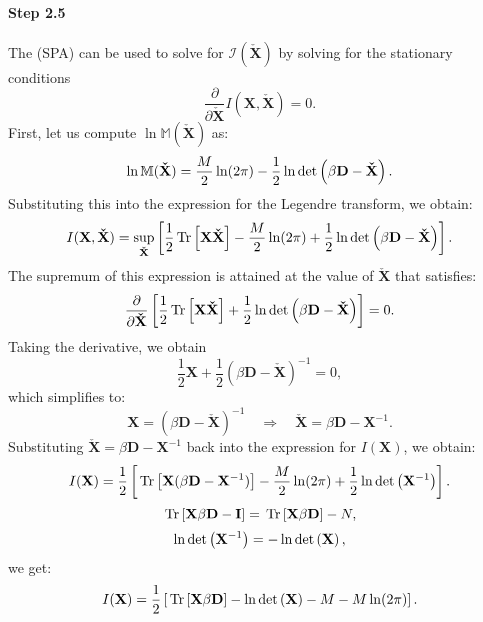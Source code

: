 \paragraph{Step 2.5}
The \SaddlePointApproximation (SPA) can be used to solve for $\mathcal{I}(\mathbf{\check{X}})$ 
by solving for the stationary conditions
\begin{equation}
  \frac{\partial}{\partial \mathbf{\check{X}}} I(\mathbf{X},\mathbf{\check{X}}) = 0  .
\end{equation}
%
First, let us compute $ \ln \mathbb{M}(\mathbf{\check{X}}) $ as:
%
\begin{equation}
\ln \mathbb{M}(\mathbf{\check{X}}) = \frac{M}{2} \ln(2\pi) - \frac{1}{2} \ln \mbox{}{\text{det}}\left(\beta\mathbf{D} - \mathbf{\check{X}}\right).
\end{equation}
%
Substituting this into the expression for the Legendre transform, we obtain:
%
\begin{equation}
I(\mathbf{X},\mathbf{\check{X}}) 
   = \sup_{\mathbf{\check{X}}} \left[\frac{1}{2} \mbox{}\operatorname{Tr}\left[\mathbf{X} \mathbf{\check{X}}\right] - \frac{M}{2} \ln(2\pi) + \frac{1}{2} \ln \mbox{}{\text{det}}\left(\beta\mathbf{D} - \mathbf{\check{X}}\right) \right].
\end{equation}
%
The supremum of this expression is attained at the value of $\mathbf{\check{X}}$ that satisfies:
%
\begin{equation}
\frac{\partial}{\partial \mathbf{\check{X}}} \left[\frac{1}{2} \mbox{}\operatorname{Tr}\left[\mathbf{X} \mathbf{\check{X}}\right] + \frac{1}{2} \ln \mbox{}{\text{det}}\left(\beta\mathbf{D} - \mathbf{\check{X}}\right) \right] = 0.
\end{equation}
%
Taking the derivative, we obtain
%
\begin{equation}
\frac{1}{2} \mathbf{X} + \frac{1}{2} (\beta\mathbf{D} - \mathbf{\check{X}})^{-1} = 0,
\end{equation}
%
which simplifies to:
%
\begin{equation}
\mathbf{X} = (\beta\mathbf{D} - \mathbf{\check{X}})^{-1} \quad \Rightarrow \quad \mathbf{\check{X}} = \beta\mathbf{D} - \mathbf{X}^{-1}.
\end{equation}
%
Substituting $ \mathbf{\check{X}} = \beta\mathbf{D} - \mathbf{X}^{-1} $ back into the expression for $ I(\mathbf{X})$, we obtain:
%
\begin{equation}
I(\mathbf{X}) = \frac{1}{2} \left[\mbox{}\operatorname{Tr}\left[\mathbf{X} (\beta\mathbf{D} - \mathbf{X}^{-1})\right] - \frac{M}{2} \ln(2\pi) + \frac{1}{2} \ln \mbox{}{\text{det}}\left(\mathbf{X}^{-1}\right)\right].
\end{equation}
%
%
\begin{equation}
\mbox{}\operatorname{Tr}\left[\mathbf{X}\beta\mathbf{D} - \mathbf{I}\right] = \mbox{}\operatorname{Tr}\left[\mathbf{X}\beta\mathbf{D}\right] - N,
\end{equation}
\begin{equation}
\ln \mbox{}{\text{det}}\left(\mathbf{X}^{-1}\right) = -\ln \mbox{}{\text{det}}\left(\mathbf{X}\right),
\end{equation}
we get:
%
\begin{equation}
I(\mathbf{X}) = \frac{1}{2} \left[\mbox{}\operatorname{Tr}\left[\mathbf{X}\beta\mathbf{D}\right] - \ln \mbox{}{\text{det}}\left(\mathbf{X}\right) - M - M\ln(2\pi)\right].
\end{equation}

